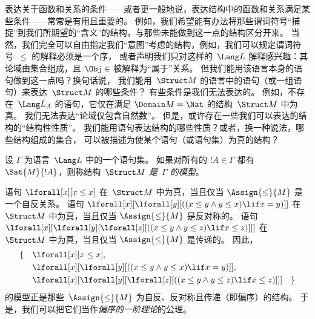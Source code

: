 \documentclass[../../../include/open-logic-section]{subfiles}
\begin{document}


\begin{explain}
表达关于函数和关系的条件——或者更一般地说，表达结构中的函数和关系满足某些条件——常常是有用且重要的。
例如，我们希望能有办法将那些谓词符号“捕捉”到我们所期望的“含义”的结构，与那些未能做到这一点的结构区分开来。
当然，我们完全可以自由指定我们“意图”考虑的结构，例如，我们可以规定谓词符号~$\le$ 的解释必须是一个序，
或者声明我们只对这样的~$\Lang L$ 解释感兴趣：其论域由集合组成，且 $\Obj \in$ 被解释为“属于”关系。
但我们能用该语言本身的语句做到这一点吗？换句话说，
我们能用~$\Struct M$ 的语言中的语句（或一组语句）来表达~$\Struct M$ 的哪些条件？
有些条件是我们无法表达的。
例如，不存在~$\Lang L_A$ 的语句，它仅在满足 $\Domain M = \Nat$ 的结构~$\Struct M$ 中为真。
我们无法表达“论域仅包含自然数”。
但是，或许存在一些我们可以表达的结构的“结构性性质”。
我们能用语句表达结构的哪些性质？或者，换一种说法，哪些结构组成的集合，
可以被描述为使某个语句（或语句集）为真的结构？
\end{explain}

\begin{defn}[集合的模型]
设 $\Gamma$ 为语言~$\Lang L$ 中的一个语句集。
如果对所有的 $!A \in \Gamma$ 都有 $\Sat{M}{!A}$，则称结构~$\Struct M$ \emph{是~$\Gamma$ 的模型}。
\end{defn}

\begin{ex}
语句 $\lforall[x][x \le x]$ 在~$\Struct M$ 中为真，当且仅当 $\Assign{\le}{M}$ 是一个自反关系。
语句 $\lforall[x][\lforall[y][((x \le y \land y \le x) \lif x = y)]]$ 在~$\Struct M$ 中为真，当且仅当 $\Assign{\le}{M}$ 是反对称的。
语句 $\lforall[x][\lforall[y][\lforall[z][((x \le y \land y \le z)
      \lif x \le z)]]]$ 在~$\Struct M$ 中为真，当且仅当 $\Assign{\le}{M}$ 是传递的。
因此，\begin{align*}
\{\quad &\lforall[x][x \le x], \\
   & \lforall[x][\lforall[y][((x \le y \land y \le
    x) \lif x = y)]], \\
   &\lforall[x][\lforall[y][\lforall[z][((x \le y
      \land y \le z) \lif x \le z)]]] \quad \}
\end{align*} 的模型正是那些~$\Assign{\le}{M}$ 为自反、反对称且传递（即偏序）的结构。
于是，我们可以把它们当作\emph{偏序的一阶理论}的公理。
\end{ex}
\end{document}
